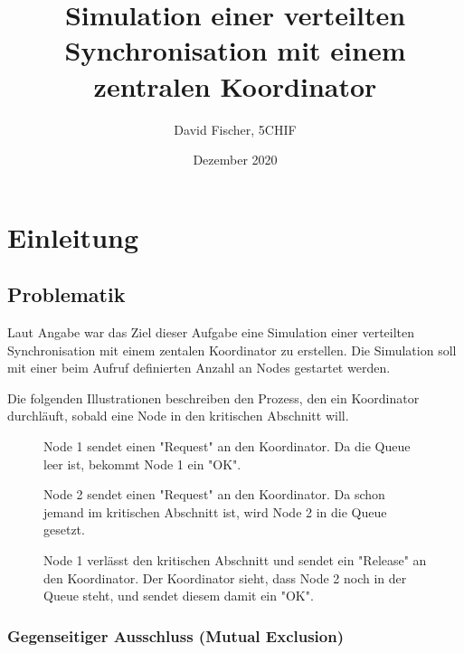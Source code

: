 \documentclass[12pt, letterpaper]{article}
\title{Simulation einer verteilten Synchronisation mit einem zentralen Koordinator}
\author{David Fischer, 5CHIF}
\date{Dezember 2020}
\begin{document}
\begin{titlepage}
\maketitle
\end{titlepage}

\tableofcontents
\newpage

\section{Einleitung}

\subsection{Problematik}
Laut Angabe war das Ziel dieser Aufgabe eine Simulation einer verteilten Synchronisation mit einem zentalen Koordinator zu erstellen. Die Simulation soll mit einer beim Aufruf definierten Anzahl an Nodes gestartet werden.

Die folgenden Illustrationen beschreiben den Prozess, den ein Koordinator durchläuft, sobald eine Node in den kritischen Abschnitt will.

\begin{figure}[H]
    \centering
    \resizebox{0.4\textwidth}{!}{}
    \caption{Node 1 sendet einen "Request" an den Koordinator. Da die Queue leer ist, bekommt Node 1 ein "OK".}
    \label{fig:situation1}
\end{figure}

\begin{figure}[H]
    \centering
    \resizebox{0.4\textwidth}{!}{}
    \caption{Node 2 sendet einen "Request" an den Koordinator. Da schon jemand im kritischen Abschnitt ist, wird Node 2 in die Queue gesetzt.}
    \label{fig:situation2}
\end{figure}


\begin{figure}[H]
    \centering
    \resizebox{0.4\textwidth}{!}{}
    \caption{Node 1 verlässt den kritischen Abschnitt und sendet ein "Release" an den Koordinator. Der Koordinator sieht, dass Node 2 noch in der Queue steht, und sendet diesem damit ein "OK". }
    \label{fig:situation3}
\end{figure}


\subsubsection{Gegenseitiger Ausschluss (Mutual Exclusion)}
\end{document}
